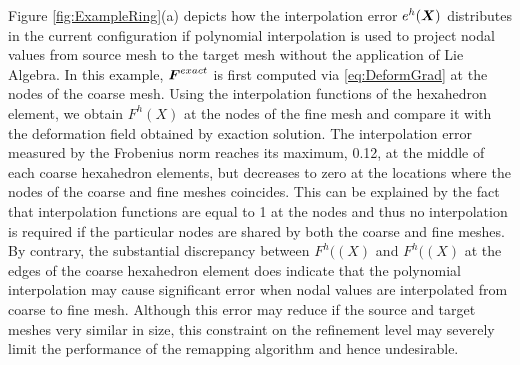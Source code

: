\documentclass[12pt]{article}
\begin{document}
Figure \ref{fig:ExampleRing}(a) depicts how the interpolation error $e^{h}({\boldsymbol{X}})$ distributes in the current configuration if polynomial interpolation is used to project nodal values from source mesh to the target mesh without the application of Lie Algebra.  In this example, ${\boldsymbol{F}}^{exact}$ is first computed via \eqref{eq:DeformGrad} at the nodes of the coarse mesh. Using the interpolation functions of the hexahedron element, we obtain $F^{h}(X)$  at the nodes of the fine mesh and compare it with the deformation field obtained by exaction solution. The interpolation error measured by the Frobenius norm reaches its maximum, 0.12, at the middle of each coarse hexahedron elements, but decreases to zero at the locations where the nodes of the coarse and fine meshes coincides. This can be explained by the fact that interpolation functions are equal to 1 at the nodes and thus no interpolation is required if the particular nodes are shared by both the coarse and fine meshes. By contrary, the substantial discrepancy between $F^{h}((X)$ and  $F^{h}((X)$ at the edges of the coarse hexahedron element does indicate that the polynomial interpolation may cause significant error when nodal values are interpolated from coarse to fine mesh. Although this error may reduce if the source and target meshes very similar in size, this constraint on the refinement level may severely limit the performance of the remapping algorithm and hence undesirable. 
\end{document}
